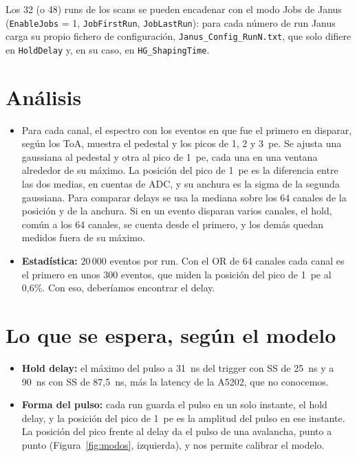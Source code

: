 \documentclass[11pt,a4paper]{article}
\begin{document}
Los 32 (o 48) runs de los scans se pueden encadenar con el modo Jobs de Janus
(\texttt{EnableJobs} = 1, \texttt{JobFirstRun}, \texttt{JobLastRun}): para cada
número de run Janus carga su propio fichero de configuración,
\texttt{Janus\_Config\_RunN.txt}, que solo difiere en \texttt{HoldDelay} y,
en su caso, en \texttt{HG\_ShapingTime}.

\section{Análisis}
\label{sec:datos}

\begin{itemize}
\item Para cada canal, el espectro con los eventos en que
  fue el primero en disparar, según los ToA, muestra el pedestal y los
  picos de 1, 2 y 3~pe. Se ajusta una gaussiana al pedestal y otra al pico
  de 1~pe, cada una en una ventana alrededor de su máximo. La posición del
  pico de 1~pe es la diferencia entre las dos medias, en cuentas de ADC, y su anchura es la sigma de la segunda gaussiana.
  Para comparar delays se usa la mediana sobre los 64 canales de la
  posición y de la anchura. Si en un evento disparan varios canales, el hold,
  común a los 64 canales, se cuenta desde el primero, y los demás quedan medidos
  fuera de su máximo.
\item {\bf Estadística:} 20\,000 eventos por run. Con el OR de 64 canales cada
  canal es el primero en unos 300 eventos, que miden la posición del pico de
  1~pe al 0,6\%. Con eso, deberíamos encontrar el delay.
\end{itemize}


\section{Lo que se espera, según el modelo}

\begin{itemize}
\item {\bf Hold delay:} el máximo del pulso a 31~ns del trigger con SS de
  25~ns y a 90~ns con SS de 87,5~ns, más la latency de la A5202, que no
  conocemos.
\item {\bf Forma del pulso:} cada run guarda el pulso en un solo instante,
  el hold delay, y la posición del pico de 1~pe es la amplitud del pulso en
  ese instante. La posición del pico frente al delay da el pulso de una
  avalancha, punto a punto (Figura~\ref{fig:modos}, izquierda), y nos
  permite calibrar el modelo.
\end{itemize}
\end{document}
